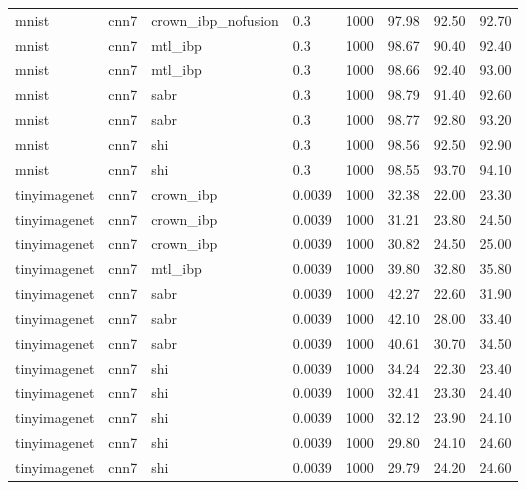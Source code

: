 \begin{tabular}{llllllll}
mnist & cnn7 & crown\_ibp\_nofusion & 0.3 & 1000 & 97.98 & 92.50 & 92.70 \\
mnist & cnn7 & mtl\_ibp & 0.3 & 1000 & 98.67 & 90.40 & 92.40 \\
mnist & cnn7 & mtl\_ibp & 0.3 & 1000 & 98.66 & 92.40 & 93.00 \\
mnist & cnn7 & sabr & 0.3 & 1000 & 98.79 & 91.40 & 92.60 \\
mnist & cnn7 & sabr & 0.3 & 1000 & 98.77 & 92.80 & 93.20 \\
mnist & cnn7 & shi & 0.3 & 1000 & 98.56 & 92.50 & 92.90 \\
mnist & cnn7 & shi & 0.3 & 1000 & 98.55 & 93.70 & 94.10 \\
tinyimagenet & cnn7 & crown\_ibp & 0.0039 & 1000 & 32.38 & 22.00 & 23.30 \\
tinyimagenet & cnn7 & crown\_ibp & 0.0039 & 1000 & 31.21 & 23.80 & 24.50 \\
tinyimagenet & cnn7 & crown\_ibp & 0.0039 & 1000 & 30.82 & 24.50 & 25.00 \\
tinyimagenet & cnn7 & mtl\_ibp & 0.0039 & 1000 & 39.80 & 32.80 & 35.80 \\
tinyimagenet & cnn7 & sabr & 0.0039 & 1000 & 42.27 & 22.60 & 31.90 \\
tinyimagenet & cnn7 & sabr & 0.0039 & 1000 & 42.10 & 28.00 & 33.40 \\
tinyimagenet & cnn7 & sabr & 0.0039 & 1000 & 40.61 & 30.70 & 34.50 \\
tinyimagenet & cnn7 & shi & 0.0039 & 1000 & 34.24 & 22.30 & 23.40 \\
tinyimagenet & cnn7 & shi & 0.0039 & 1000 & 32.41 & 23.30 & 24.40 \\
tinyimagenet & cnn7 & shi & 0.0039 & 1000 & 32.12 & 23.90 & 24.10 \\
tinyimagenet & cnn7 & shi & 0.0039 & 1000 & 29.80 & 24.10 & 24.60 \\
tinyimagenet & cnn7 & shi & 0.0039 & 1000 & 29.79 & 24.20 & 24.60 \\
\bottomrule
\end{tabular}